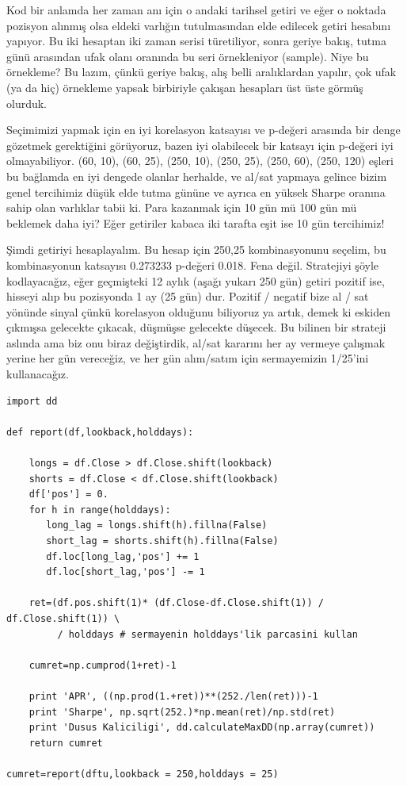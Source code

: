 \documentclass[12pt,fleqn]{article}\usepackage{../../common}
\begin{document}
Kod bir anlamda her zaman anı için o andaki tarihsel getiri ve eğer o
noktada pozisyon alınmış olsa eldeki varlığın tutulmasından elde edilecek
getiri hesabını yapıyor. Bu iki hesaptan iki zaman serisi türetiliyor,
sonra geriye bakış, tutma günü arasından ufak olanı oranında bu seri
örnekleniyor (sample). Niye bu örnekleme? Bu lazım, çünkü geriye bakış,
alış belli aralıklardan yapılır, çok ufak (ya da hiç) örnekleme yapsak
birbiriyle çakışan hesapları üst üste görmüş olurduk.

Seçimimizi yapmak için en iyi korelasyon katsayısı ve p-değeri arasında bir
denge gözetmek gerektiğini görüyoruz, bazen iyi olabilecek bir katsayı için
p-değeri iyi olmayabiliyor.  (60, 10), (60, 25), (250, 10), (250, 25),
(250, 60), (250, 120) eşleri bu bağlamda en iyi dengede olanlar herhalde,
ve al/sat yapmaya gelince bizim genel tercihimiz düşük elde tutma gününe ve
ayrıca en yüksek Sharpe oranına sahip olan varlıklar tabii ki. Para
kazanmak için 10 gün mü 100 gün mü beklemek daha iyi? Eğer getiriler kabaca
iki tarafta eşit ise 10 gün tercihimiz!

Şimdi getiriyi hesaplayalım. Bu hesap için 250,25 kombinasyonunu seçelim,
bu kombinasyonun katsayısı 0.273233 p-değeri 0.018. Fena değil. Stratejiyi
şöyle kodlayacağız, eğer geçmişteki 12 aylık (aşağı yukarı 250 gün) getiri
pozitif ise, hisseyi alıp bu pozisyonda 1 ay (25 gün) dur. Pozitif /
negatif bize al / sat yönünde sinyal çünkü korelasyon olduğunu biliyoruz ya
artık, demek ki eskiden çıkmışsa gelecekte çıkacak, düşmüşse gelecekte
düşecek. Bu bilinen bir strateji aslında ama biz onu biraz değiştirdik,
al/sat kararını her ay vermeye çalışmak yerine her gün vereceğiz, ve her
gün alım/satım için sermayemizin 1/25'ini kullanacağız.

\begin{verbatim}
import dd

def report(df,lookback,holddays):

    longs = df.Close > df.Close.shift(lookback)
    shorts = df.Close < df.Close.shift(lookback)
    df['pos'] = 0.
    for h in range(holddays):
       long_lag = longs.shift(h).fillna(False)
       short_lag = shorts.shift(h).fillna(False)
       df.loc[long_lag,'pos'] += 1
       df.loc[short_lag,'pos'] -= 1

    ret=(df.pos.shift(1)* (df.Close-df.Close.shift(1)) / df.Close.shift(1)) \
         / holddays # sermayenin holddays'lik parcasini kullan

    cumret=np.cumprod(1+ret)-1

    print 'APR', ((np.prod(1.+ret))**(252./len(ret)))-1
    print 'Sharpe', np.sqrt(252.)*np.mean(ret)/np.std(ret)
    print 'Dusus Kaliciligi', dd.calculateMaxDD(np.array(cumret))
    return cumret

cumret=report(dftu,lookback = 250,holddays = 25)
\end{verbatim}
\end{document}
